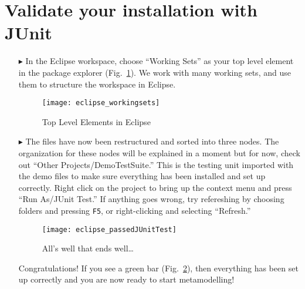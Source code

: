 \newpage
\genHeader
{}

\section{Validate your installation with JUnit}

\begin{itemize}

\item[$\blacktriangleright$] In\hypertarget{validate common}{} the Eclipse workspace, choose ``Working Sets'' as your top level element in the package explorer
(Fig.~\ref{fig_topLevel}). We work with many working sets, and use them to structure the workspace in Eclipse.

\begin{figure}[htbp]
	\centering
  \texttt{[image: eclipse\_workingsets]}
	\caption{Top Level Elements in Eclipse}
	\label{fig_topLevel}
\end{figure}

\item[$\blacktriangleright$] The files have now been restructured and sorted into three nodes. The organization for these nodes will be explained in a moment
but for now, check out ``Other Projects/DemoTestSuite.'' This is the testing unit imported with the demo files to make sure everything has been installed and
set up correctly. Right click on the project to bring up the context menu and press ``Run As/JUnit Test.'' If anything goes wrong, try refereshing by choosing
folders and pressing  \texttt{F5}, or right-clicking and selecting ``Refresh.''

\vspace{0.5cm}

\begin{figure}[htbp]
	\centering
  \texttt{[image: eclipse\_passedJUnitTest]}
	\caption{All's well that ends well\ldots}
	\label{fig_passedTest}
\end{figure}

\vspace{0.5cm}

Congratulations!  If you see a green bar  (Fig.~\ref{fig_passedTest}), then everything has been set up correctly and you are now ready to start metamodelling!

\end{itemize}